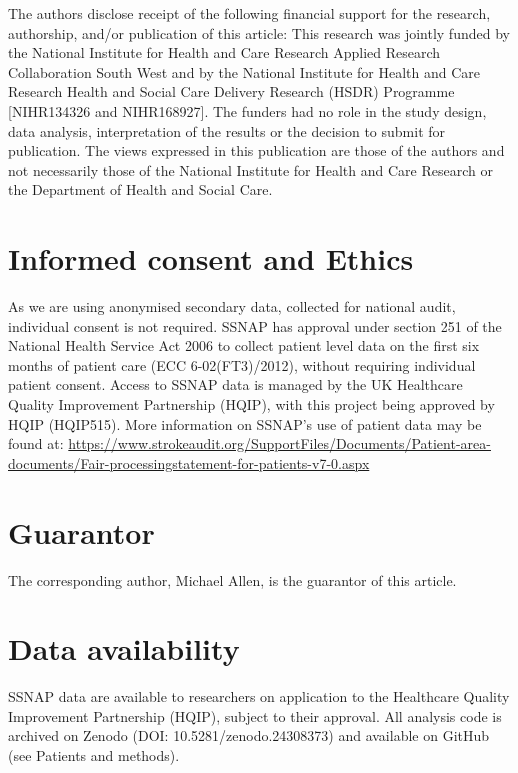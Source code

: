 The authors disclose receipt of the following financial support for the research, authorship, and/or publication of this article: This research was jointly funded by the National Institute for Health and Care Research Applied Research Collaboration South West and by the National Institute for Health and Care Research Health and Social Care Delivery Research (HSDR) Programme [NIHR134326 and NIHR168927]. The funders had no role in the study design, data analysis, interpretation of the results or the decision to submit for publication.
 The views expressed in this publication are those of the authors and not necessarily those of the National Institute for Health and Care Research or the Department of Health and Social Care.

\section*{Informed consent and Ethics}

As we are using anonymised secondary data, collected for national audit, individual consent is not required. SSNAP has approval under section 251 of the National Health Service Act 2006 to collect patient level data on the first six months of patient care (ECC 6-02(FT3)/2012), without requiring individual patient consent. Access to SSNAP data is managed by the UK Healthcare Quality Improvement Partnership (HQIP), with this project being approved by HQIP (HQIP515). More information on SSNAP's use of patient data may be found at: \url{https://www.strokeaudit.org/SupportFiles/Documents/Patient-area-documents/Fair-processingstatement-for-patients-v7-0.aspx}

\section*{Guarantor}

The corresponding author, Michael Allen, is the guarantor of this article.


\section*{Data availability}

SSNAP data are available to researchers on application to the Healthcare Quality Improvement Partnership (HQIP), subject to their approval. All analysis code is archived on Zenodo (DOI: 10.5281/zenodo.24308373)\cite{allen_samuel3_2026} and available on GitHub (see Patients and methods).
